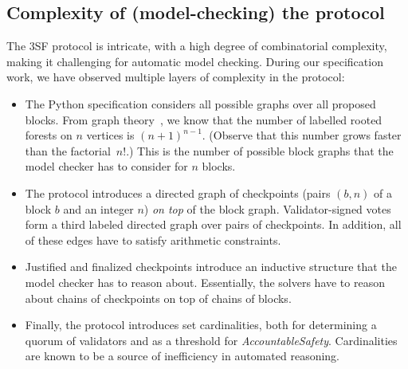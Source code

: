 \subsection{Complexity of (model-checking) the protocol}

The 3SF protocol is intricate, with a high degree of combinatorial complexity,
making it challenging for automatic model checking. During our specification
work, we have observed multiple layers of complexity in the protocol:
\begin{itemize}
  \item The Python specification considers all possible graphs over all proposed
    blocks. From graph theory~\cite{cayley1878theorem}, we know that the number
    of labelled rooted forests on $n$ vertices is ${(n+1)}^{n-1}$. (Observe that
    this number grows faster than the factorial~$n!$.) This is the number of
    possible block graphs that the model checker has to consider for $n$ blocks.
  \item The protocol introduces a directed graph of checkpoints (pairs $(b,n)$
    of a block $b$ and an integer $n$) \emph{on top} of the block graph.
    Validator-signed votes form a third labeled directed graph over pairs of
    checkpoints. In addition, all of these edges have to satisfy arithmetic
    constraints.
  \item Justified and finalized checkpoints introduce an inductive structure
    that the model checker has to reason about. Essentially, the solvers have to
    reason about chains of checkpoints on top of chains of blocks.
  \item Finally, the protocol introduces set cardinalities, both for determining a
    quorum of validators and as a threshold for \textit{AccountableSafety}.
    Cardinalities are known to be a source of inefficiency in automated
    reasoning.
\end{itemize}
